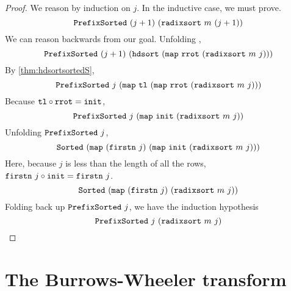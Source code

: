 \documentclass[sigplan,10pt,anonymous,review]{thesis}
\begin{document}
\radixsortsortedinv*
\begin{proof}
  We reason by induction on $j$. In the inductive case, we must prove.
  \begin{equation*}
    \texttt{\textup{PrefixSorted}}~(j+1)~(\texttt{\textup{radixsort}}~m~(j+1))
  \end{equation*}
  We can reason backwards from our goal. Unfolding ,
  \begin{equation*}
    \texttt{\textup{PrefixSorted}}~(j+1)~(\texttt{\textup{hdsort}}~(\texttt{\textup{map}}~\texttt{\textup{rrot}}~(\texttt{\textup{radixsort}}~m~j)))
  \end{equation*}
  By \cref{thm:hdsortsortedS},
  \begin{equation*}
    \texttt{\textup{PrefixSorted}}~j~(\texttt{\textup{map}}~\texttt{\textup{tl}}~(\texttt{\textup{map}}~\texttt{\textup{rrot}}~(\texttt{\textup{radixsort}}~m~j)))
  \end{equation*}
  Because $\texttt{\textup{tl}} \circ \texttt{\textup{rrot}} = \texttt{\textup{init}}$,
  \begin{equation*}
    \texttt{\textup{PrefixSorted}}~j~(\texttt{\textup{map}}~\texttt{\textup{init}}~(\texttt{\textup{radixsort}}~m~j))
  \end{equation*}
  Unfolding $\texttt{\textup{PrefixSorted}}~j$,
  \begin{equation*}
    \texttt{\textup{Sorted}}~(\texttt{\textup{map}}~(\texttt{\textup{firstn}}~j)~(\texttt{\textup{map}}~\texttt{\textup{init}}~(\texttt{\textup{radixsort}}~m~j)))
  \end{equation*}
  Here, because $j$ is less than the length of all the rows,
  $\texttt{\textup{firstn}}~j \circ \texttt{\textup{init}} = \texttt{\textup{firstn}}~j$.
  \begin{equation*}
    \texttt{\textup{Sorted}}~(\texttt{\textup{map}}~(\texttt{\textup{firstn}}~j)~(\texttt{\textup{radixsort}}~m~j))
  \end{equation*}
  Folding back up $\texttt{\textup{PrefixSorted}}~j$, we have the induction hypothesis
  \begin{equation*}
    \texttt{\textup{PrefixSorted}}~j~(\texttt{\textup{radixsort}}~m~j) \qedhere
  \end{equation*}
\end{proof}

\section{The Burrows-Wheeler transform}
\label{sec:bwt}
\end{document}
